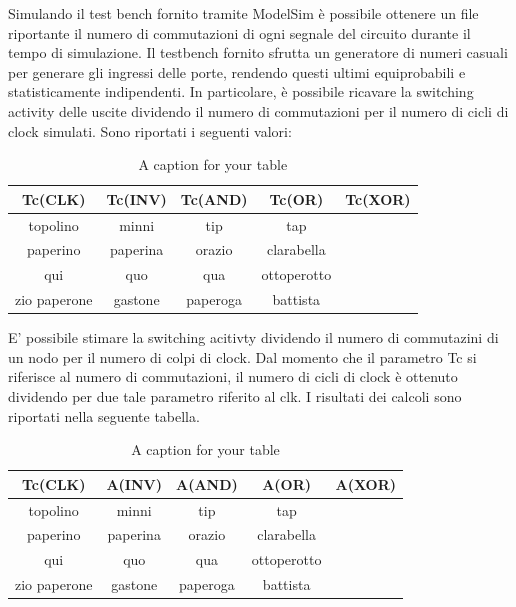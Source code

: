 Simulando il test bench fornito tramite ModelSim è possibile ottenere un file riportante il numero di commutazioni di ogni segnale del circuito durante il tempo di simulazione.
Il testbench fornito sfrutta un generatore di numeri casuali per generare gli ingressi delle porte, rendendo questi ultimi equiprobabili e statisticamente indipendenti. 
In particolare, è possibile ricavare la switching activity delle uscite dividendo il numero di commutazioni per il numero di cicli di clock simulati.
Sono riportati i seguenti valori:

\begin{table}
\begin{center}
\begin{tabular}{|c|c|c|c|c|}
\hline
Tc(CLK) & Tc(INV) & Tc(AND) & Tc(OR) & Tc(XOR) \\
\hline
topolino & minni & tip & tap \\
\hline
\hline
paperino & paperina & orazio & clarabella \\
\hline
qui & quo & qua & ottoperotto \\
zio paperone & gastone & paperoga & battista \\ 
\hline 
\end{tabular}
\end{center}
\caption{A caption for your table}
\label{A-lable-for-your-table}
\end{table}

E' possibile stimare la switching acitivty dividendo il numero di commutazini di un nodo per il numero di colpi di clock.
Dal momento che il parametro Tc si riferisce al numero di commutazioni, il numero di cicli di clock è ottenuto dividendo per due tale parametro riferito al clk.
I risultati dei calcoli sono riportati nella seguente tabella. 

\begin{table}
\begin{center}
\begin{tabular}{|c|c|c|c|c|}
\hline
Tc(CLK) & A(INV) & A(AND) & A(OR) & A(XOR) \\
\hline
topolino & minni & tip & tap \\
\hline
\hline
paperino & paperina & orazio & clarabella \\
\hline
qui & quo & qua & ottoperotto \\
zio paperone & gastone & paperoga & battista \\ 
\hline 
\end{tabular}
\end{center}
\caption{A caption for your table}
\label{A-lable-for-your-table}
\end{table}

